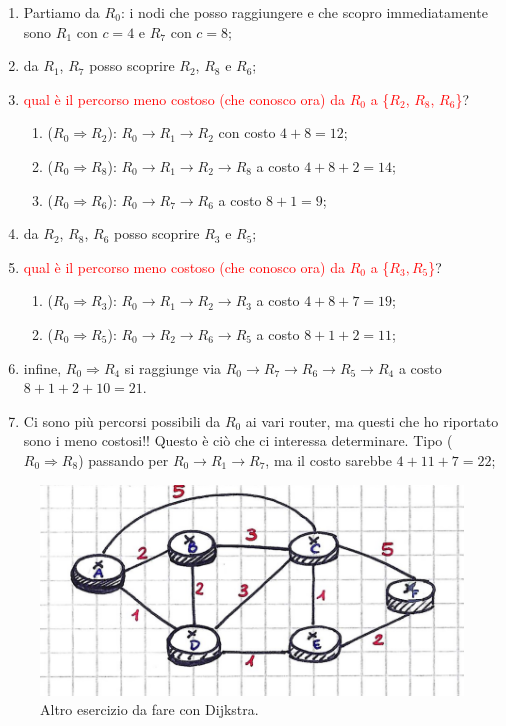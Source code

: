 \begin{enumerate}
    \item Partiamo da $R_0$: i nodi che posso raggiungere e che scopro immediatamente sono $R_1$ con $c=4$ e $R_7$ con $c=8$;
    \item da $R_1$, $R_7$ posso scoprire $R_2$, $R_8$ e $R_6$;
    \item \textcolor{Red}{qual è il percorso meno costoso (che conosco ora) da $R_0$ a \{$R_2$, $R_8$, $R_6$\}}?
    \begin{enumerate}
        \item ($R_0\Rightarrow R_2$): $R_0\rightarrow R_1 \rightarrow R_2$ con costo $4+8=12$;
        \item ($R_0\Rightarrow R_8$): $R_0 \rightarrow R_1 \rightarrow R_2 \rightarrow R_8$ a costo $4+8+2=14$;
        \item ($R_0 \Rightarrow R_6$): $R_0\rightarrow R_7 \rightarrow R_6$ a costo $8+1=9$;
    \end{enumerate}
    \item da $R_2$, $R_8$, $R_6$ posso scoprire $R_3$ e $R_5$;
    \item \textcolor{Red}{qual è il percorso meno costoso (che conosco ora) da $R_0$ a \{$R_3, R_5$\}}?
    \begin{enumerate}
        \item ($R_0\Rightarrow R_3$): $R_0\rightarrow R_1 \rightarrow R_2 \rightarrow R_3$ a costo $4+8+7=19$;
        \item ($R_0 \Rightarrow R_5$): $R_0 \rightarrow R_2 \rightarrow R_6 \rightarrow R_5$ a costo $8+1+2=11$;
    \end{enumerate}
    \item infine, $R_0 \Rightarrow R_4$ si raggiunge via $R_0 \rightarrow R_7 \rightarrow R_6 \rightarrow R_5 \rightarrow R_4$ a costo $8+1+2+10=21$.
    \item Ci sono più percorsi possibili da $R_0$ ai vari router, ma questi che ho riportato sono i meno costosi!! Questo è ciò che ci interessa determinare. Tipo ($R_0\Rightarrow R_8$) passando per $R_0 \rightarrow R_1 \rightarrow R_7$, ma il costo sarebbe $4+11+7=22$;
\end{enumerate}

\begin{figure} [ht]
    \centering
    \includegraphics[width=0.75\linewidth]{Figures/05/dijkstra2.png}
    \caption{Altro esercizio da fare con Dijkstra.}
    \label{fig:dijk2}
\end{figure}

